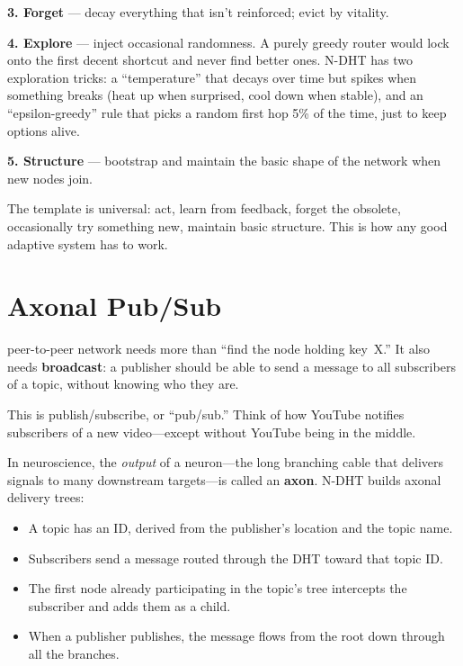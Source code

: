 \documentclass[nobib]{tufte-handout}
\begin{document}
\textbf{3. Forget} --- decay everything that isn't reinforced; evict by vitality.

\textbf{4. Explore} --- inject occasional randomness. A purely greedy router would lock onto the first decent shortcut and never find better ones. N-DHT has two exploration tricks: a ``temperature'' that decays over time but spikes when something breaks (heat up when surprised, cool down when stable), and an ``epsilon-greedy'' rule that picks a random first hop 5\% of the time, just to keep options alive.

\textbf{5. Structure} --- bootstrap and maintain the basic shape of the network when new nodes join.

The template is universal: act, learn from feedback, forget the obsolete, occasionally try something new, maintain basic structure. This is how any good adaptive system has to work.

\section{Axonal Pub/Sub}

 peer-to-peer network needs more than ``find the node holding key~X.'' It also needs \textbf{broadcast}: a publisher should be able to send a message to all subscribers of a topic, without knowing who they are.

This is publish/subscribe, or ``pub/sub.'' Think of how YouTube notifies subscribers of a new video---except without YouTube being in the middle.

In neuroscience, the \emph{output} of a neuron---the long branching cable that delivers signals to many downstream targets---is called an \textbf{axon}. N-DHT builds axonal delivery trees:

\begin{itemize}
  \item A topic has an ID, derived from the publisher's location and the topic name.
  \item Subscribers send a message routed through the DHT toward that topic ID.
  \item The first node already participating in the topic's tree intercepts the subscriber and adds them as a child.
  \item When a publisher publishes, the message flows from the root down through all the branches.
\end{itemize}
\end{document}
